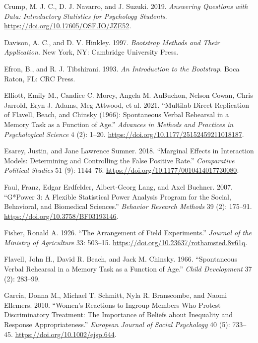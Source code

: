 \documentclass[
  11pt,
  letterpaper,
]{scrbook}
\newlength{\cslhangindent}
\newlength{\cslentryspacingunit} %
\newenvironment{CSLReferences}[2] %
 {%
  \setlength{\parindent}{0pt}
  \ifodd #1
  \let\oldpar\par
  \def\par{\hangindent=\cslhangindent\oldpar}
  \fi
  \setlength{\parskip}{#2\cslentryspacingunit}
 }%
 {}
\theoremstyle{definition}
\theoremstyle{remark}
\begin{document}
\begin{CSLReferences}{1}{0}
\leavevmode{}%
Crump, M. J. C., D. J. Navarro, and J. Suzuki. 2019. \emph{Answering
Questions with Data: Introductory Statistics for Psychology Students}.
\url{https://doi.org/10.17605/OSF.IO/JZE52}.

\leavevmode{}%
Davison, A. C., and D. V. Hinkley. 1997. \emph{Bootstrap Methods and
Their Application}. New York, NY: Cambridge University Press.

\leavevmode{}%
Efron, B., and R. J. Tibshirani. 1993. \emph{An Introduction to the
Bootstrap}. Boca Raton, FL: CRC Press.

\leavevmode{}%
Elliott, Emily M., Candice C. Morey, Angela M. AuBuchon, Nelson Cowan,
Chris Jarrold, Eryn J. Adams, Meg Attwood, et al. 2021. {``Multilab
Direct Replication of {F}lavell, {B}each, and {C}hinsky (1966):
Spontaneous Verbal Rehearsal in a Memory Task as a Function of Age.''}
\emph{Advances in Methods and Practices in Psychological Science} 4 (2):
1--20. \url{https://doi.org/10.1177/25152459211018187}.

\leavevmode{}%
Esarey, Justin, and Jane Lawrence Sumner. 2018. {``Marginal Effects in
Interaction Models: Determining and Controlling the False Positive
Rate.''} \emph{Comparative Political Studies} 51 (9): 1144--76.
\url{https://doi.org/10.1177/0010414017730080}.

\leavevmode{}%
Faul, Franz, Edgar Erdfelder, Albert-Georg Lang, and Axel Buchner. 2007.
{``{G*Power 3}: A Flexible Statistical Power Analysis Program for the
Social, Behavioral, and Biomedical Sciences.''} \emph{Behavior Research
Methods} 39 (2): 175--91. \url{https://doi.org/10.3758/BF03193146}.

\leavevmode{}%
Fisher, Ronald A. 1926. {``The Arrangement of Field Experiments.''}
\emph{Journal of the Ministry of Agriculture} 33: 503--15.
\url{https://doi.org/10.23637/rothamsted.8v61q}.

\leavevmode{}%
Flavell, John H., David R. Beach, and Jack M. Chinsky. 1966.
{``Spontaneous Verbal Rehearsal in a Memory Task as a Function of
Age.''} \emph{Child Development} 37 (2): 283--99.

\leavevmode{}%
Garcia, Donna M., Michael T. Schmitt, Nyla R. Branscombe, and Naomi
Ellemers. 2010. {``Women's Reactions to Ingroup Members Who Protest
Discriminatory Treatment: The Importance of Beliefs about Inequality and
Response Appropriateness.''} \emph{European Journal of Social
Psychology} 40 (5): 733--45. \url{https://doi.org/10.1002/ejsp.644}.


\end{CSLReferences}
\end{document}
